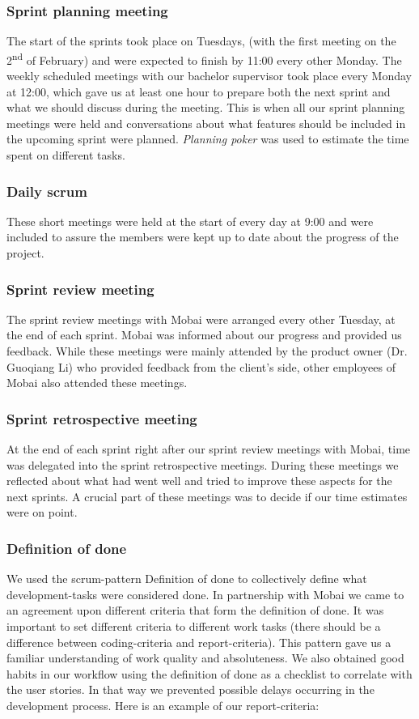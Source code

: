 \subsubsection*{Sprint planning meeting}
The start of the sprints took place on Tuesdays, (with the first meeting on the 2\textsuperscript{nd} of February) and were expected to finish by 11:00 every other Monday. The weekly scheduled meetings with our bachelor supervisor took place every Monday at 12:00, which gave us at least one hour to prepare both the next sprint and what we should discuss during the meeting. This is when all our sprint planning meetings were held and conversations about what features should be included in the upcoming sprint were planned. \textit{Planning poker} was used to estimate the time spent on different tasks.

\subsubsection*{Daily scrum}
These short meetings were held at the start of every day at 9:00 and were included to assure the members were kept up to date about the progress of the project.

\subsubsection*{Sprint review meeting}
The sprint review meetings with Mobai were arranged every other Tuesday, at the end of each sprint. Mobai was informed about our progress and provided us feedback. While these meetings were mainly attended by the product owner (Dr. Guoqiang Li) who provided feedback from the client's side, other employees of Mobai also attended these meetings. 

\subsubsection*{Sprint retrospective meeting}
At the end of each sprint right after our sprint review meetings with Mobai, time was delegated into the sprint retrospective meetings. During these meetings we reflected about what had went well and tried to improve these aspects for the next sprints. A crucial part of these meetings was to decide if our time estimates were on point. 

\subsubsection{Definition of done}
We used the scrum-pattern Definition of done \cite{DoneDone} to collectively define what development-tasks were considered done. In partnership with Mobai we came to an agreement upon different criteria that form the definition of done. It was important to set different criteria to different work tasks (there should be a difference between coding-criteria and report-criteria). This pattern gave us a familiar understanding of work quality and absoluteness. We also obtained good habits in our workflow using the definition of done as a checklist to correlate with the user stories. In that way we prevented possible delays occurring in the development process. Here is an example of our report-criteria: 

